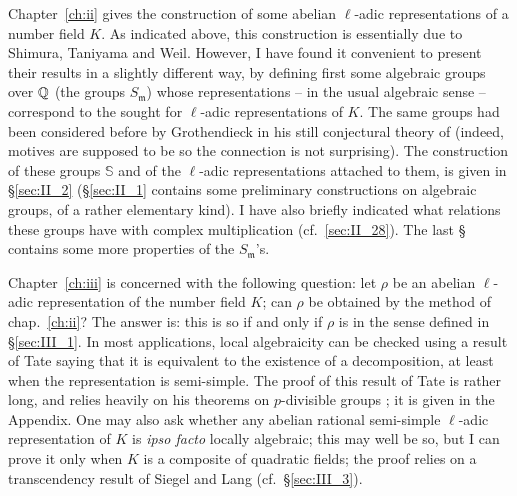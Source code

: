 Chapter~\ref{ch:ii} gives the construction of some abelian $\ell$-adic
representations of a number field $K$. As indicated above, this construction is
essentially due to Shimura, Taniyama and Weil. However, I have found it
convenient to present their results in a slightly different way, by defining
first some algebraic groups over $\mathbb{Q}$ (the groups $S_{\mathfrak{m}}$) whose
representations -- in the usual algebraic sense -- correspond to the sought for
$\ell$-adic representations of $K$.
The same groups had been considered before by Grothendieck in his still
conjectural theory of  (indeed, motives are supposed to be
 so the connection is not
surprising).
The construction of these groups $\mathbb{S}$ and of the $\ell$-adic
representations attached to them, is given in \S\ref{sec:II_2}
(\S\ref{sec:II_1} contains some preliminary constructions on algebraic groups,
of a rather elementary kind).
I have also briefly indicated what relations these groups have with complex
multiplication (cf.\ \ref{sec:II_28}).
The last \S{} contains some more properties of the $S_{\mathfrak{m}}$'s.

Chapter~\ref{ch:iii} is concerned with the following question: let $\rho$ be an
abelian $\ell$-adic representation of the number field $K$; can $\rho$ be
obtained by the method of chap.~\ref{ch:ii}?
The answer is: this is so if and only if $\rho$ is \emph{} in the sense defined in \S\ref{sec:III_1}.
In most applications, local algebraicity can be checked using a result of Tate
saying that it is equivalent to the existence of a 
decomposition, at least when the representation is semi-simple.
The proof of this result of Tate is rather long, and relies heavily on his
theorems on $p$-divisible groups \cite{39}; it is given in the Appendix.
One may also ask whether any abelian rational semi-simple $\ell$-adic
representation of $K$ is \emph{ipso facto} locally algebraic; this may well be
so, but I can prove it only when $K$ is a composite of quadratic fields; the
proof relies on a transcendency result of Siegel and Lang (cf.\
\S\ref{sec:III_3}).


